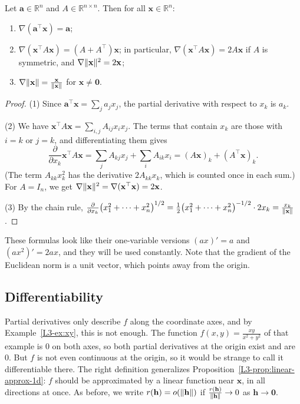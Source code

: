 \begin{proposition}\label{L3-prop:basic-gradients}
    Let $\mathbf{a} \in \mathbb{R}^n$ and $A \in \mathbb{R}^{n \times n}$. Then for all $\mathbf{x} \in \mathbb{R}^n$:
    \begin{enumerate}
        \item $\nabla (\mathbf{a}^\top \mathbf{x}) = \mathbf{a}$;
        \item $\nabla (\mathbf{x}^\top A \mathbf{x}) = (A + A^\top)\mathbf{x}$; in particular, $\nabla (\mathbf{x}^\top A \mathbf{x}) = 2A\mathbf{x}$ if $A$ is symmetric, and $\nabla \lVert \mathbf{x} \rVert^2 = 2\mathbf{x}$;
        \item $\nabla \lVert \mathbf{x} \rVert = \frac{\mathbf{x}}{\lVert \mathbf{x} \rVert}$ for $\mathbf{x} \neq \mathbf{0}$.
    \end{enumerate}
\end{proposition}

\begin{proof}
    (1) Since $\mathbf{a}^\top \mathbf{x} = \sum_j a_j x_j$, the partial derivative with respect to $x_k$ is $a_k$.

    (2) We have $\mathbf{x}^\top A \mathbf{x} = \sum_{i, j} A_{ij} x_i x_j$. The terms that contain $x_k$ are those with $i = k$ or $j = k$, and differentiating them gives
    \[\frac{\partial}{\partial x_k} \mathbf{x}^\top A \mathbf{x} = \sum_j A_{kj} x_j + \sum_i A_{ik} x_i = (A\mathbf{x})_k + (A^\top \mathbf{x})_k.\]
    (The term $A_{kk} x_k^2$ has the derivative $2A_{kk} x_k$, which is counted once in each sum.) For $A = I_n$, we get $\nabla \lVert \mathbf{x} \rVert^2 = \nabla(\mathbf{x}^\top \mathbf{x}) = 2\mathbf{x}$.

    (3) By the chain rule, $\frac{\partial}{\partial x_k} \big(x_1^2 + \cdots + x_n^2\big)^{1/2} = \frac{1}{2} \big(x_1^2 + \cdots + x_n^2\big)^{-1/2} \cdot 2x_k = \frac{x_k}{\lVert \mathbf{x} \rVert}$.
\end{proof}

These formulas look like their one-variable versions $(ax)' = a$ and $(ax^2)' = 2ax$, and they will be used constantly. Note that the gradient of the Euclidean norm is a unit vector, which points away from the origin.

\subsection{Differentiability}

Partial derivatives only describe $f$ along the coordinate axes, and by Example~\ref{L3-ex:xy}, this is not enough. The function $f(x, y) = \frac{xy}{x^2 + y^2}$ of that example is $0$ on both axes, so both partial derivatives at the origin exist and are $0$. But $f$ is not even continuous at the origin, so it would be strange to call it differentiable there. The right definition generalizes Proposition~\ref{L3-prop:linear-approx-1d}: $f$ should be approximated by a linear function near $\mathbf{x}$, in all directions at once. As before, we write $r(\mathbf{h}) = o(\lVert \mathbf{h} \rVert)$ if $\frac{r(\mathbf{h})}{\lVert \mathbf{h} \rVert} \to 0$ as $\mathbf{h} \to \mathbf{0}$.

